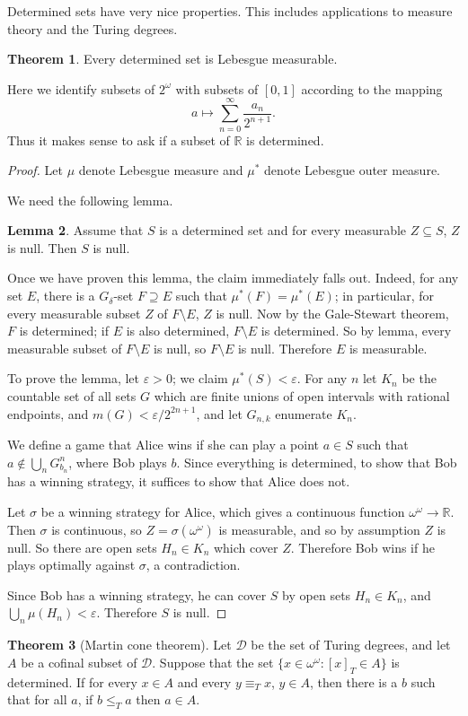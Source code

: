 \documentclass[12pt]{report}
\newcommand{\RR}{\mathbb{R}}
\theoremstyle{definition}
\newtheorem{theorem}{Theorem}[chapter]
\newtheorem{lemma}[theorem]{Lemma}
\begin{document}
Determined sets have very nice properties. This includes applications to measure theory and the Turing degrees.
\begin{theorem}
Every determined set is Lebesgue measurable.
\end{theorem}
Here we identify subsets of $2^\omega$ with subsets of $[0, 1]$ according to the mapping
$$a \mapsto \sum_{n=0}^\infty \frac{a_n}{2^{n+1}}.$$
Thus it makes sense to ask if a subset of $\RR$ is determined.
\begin{proof}
Let $\mu$ denote Lebesgue measure and $\mu^*$ denote Lebesgue outer measure.

We need the following lemma.
\begin{lemma}
Assume that $S$ is a determined set and for every measurable $Z \subseteq S$, $Z$ is null. Then $S$ is null.
\end{lemma}
Once we have proven this lemma, the claim immediately falls out.
Indeed, for any set $E$, there is a $G_\delta$-set $F \supseteq E$ such that $\mu^*(F) = \mu^*(E)$; in particular, for every measurable subset $Z$ of $F \setminus E$, $Z$ is null.
Now by the Gale-Stewart theorem, $F$ is determined; if $E$ is also determined, $F \setminus E$ is determined.
So by lemma, every measurable subset of $F \setminus E$ is null, so $F \setminus E$ is null. Therefore $E$ is measurable.

To prove the lemma, let $\varepsilon > 0$; we claim $\mu^*(S) < \varepsilon$. For any $n$ let $K_n$ be the countable set of all sets $G$ which are finite unions of open intervals with rational endpoints, and $m(G) < \varepsilon/2^{2n+1}$, and let $G_{n,k}$ enumerate $K_n$.

We define a game that Alice wins if she can play a point $a \in S$ such that $a \notin \bigcup_n G_{b_n}^n$, where Bob plays $b$.
Since everything is determined, to show that Bob has a winning strategy, it suffices to show that Alice does not.

Let $\sigma$ be a winning strategy for Alice, which gives a continuous function $\omega^\omega \to \RR$. Then $\sigma$ is continuous, so $Z = \sigma(\omega^\omega)$ is measurable, and so by assumption $Z$ is null. So there are open sets $H_n \in K_n$ which cover $Z$. Therefore Bob wins if he plays optimally against $\sigma$, a contradiction.

Since Bob has a winning strategy, he can cover $S$ by open sets $H_n \in K_n$, and $\bigcup_n \mu(H_n) < \varepsilon$. Therefore $S$ is null.
\end{proof}
\begin{theorem}[Martin cone theorem]
Let $\mathcal D$ be the set of Turing degrees, and let $A$ be a cofinal subset of $\mathcal D$. Suppose that the set $\{x \in \omega^\omega: [x]_T \in A\}$ is determined. If for every $x \in A$ and every $y \equiv_T x$, $y \in A$, then there is a $b$ such that for all $a$, if $b \leq_T a$ then $a \in A$.
\end{theorem}
\end{document}
